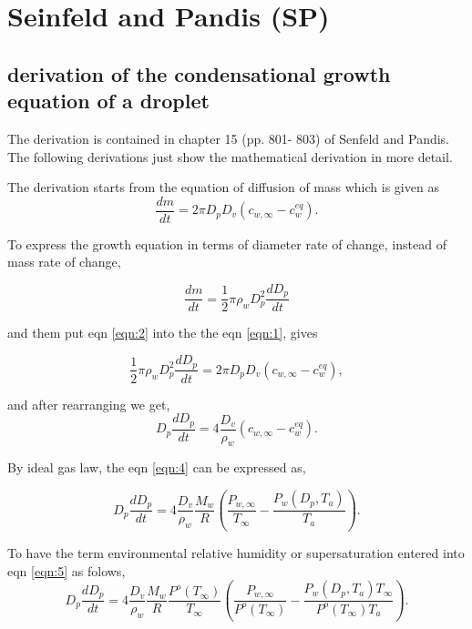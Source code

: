 \documentclass[12pt]{amsart}
\begin{document}
 
\section{Seinfeld and Pandis (SP) }

\subsection{derivation of the condensational growth equation of a droplet}


The derivation is contained in chapter 15 (pp. 801- 803) of Senfeld and Pandis. The following derivations just show the mathematical derivation in more detail.

The derivation starts from the equation of diffusion of mass which is given as
\begin{equation}\label{eqn:1}
\frac{dm}{dt}=2 \pi D_{p} D_{v} (c_{w, \infty} - c_{w}^{eq}).  
\end{equation}

To express the growth equation in terms of diameter rate of change, instead of mass rate of change,

\begin{equation}\label{eqn:2}
\frac{dm}{dt}=\frac{1}{2} \pi \rho_{w} D_{p}^{2} \frac{dD_{p}}{dt}
\end{equation}

and them put eqn \ref{eqn:2} into the the eqn \ref{eqn:1}, gives

\begin{equation}\label{eqn:3}
\frac{1}{2} \pi \rho_{w} D_{p}^{2} \frac{dD_{p}}{dt}= 2 \pi D_{p} D_{v} (c_{w, \infty} - c_{w}^{eq}),
\end{equation}

and after rearranging we get, 
\begin{equation}\label{eqn:4}
D_{p}\frac{dD_{p}}{dt}=4 \frac{D_{v}} {\rho_{w}} (c_{w, \infty} - c_{w}^{eq}).
\end{equation}

By ideal gas law, the eqn \ref{eqn:4} can be expressed as,

\begin{equation}\label{eqn:5}
D_{p}\frac{dD_{p}}{dt}=4 \frac{D_{v}} {\rho_{w}} \frac{M_{w}}{R} (\frac{P_{w, \infty}}{T_{\infty}} - \frac{P_{w}(D_{p}, T_{a})}{T_{a}}).
\end{equation}

To have the term environmental relative humidity or supersaturation entered into eqn \ref{eqn:5} as folows,  
\begin{equation}\label{eqn:6}
D_{p}\frac{dD_{p}}{dt}=4  \frac{D_{v}} {\rho_{w}} \frac{M_{w}}{R} \frac{P^{o}(T_{\infty})} {T_{\infty}} (\frac{P_{w, \infty}}{P^{o}(T_{\infty})} - \frac{P_{w}(D_{p}, T_{a}) T_{\infty}}{P^{o}(T_{\infty}) T_{a}}).
\end{equation}
\end{document}
